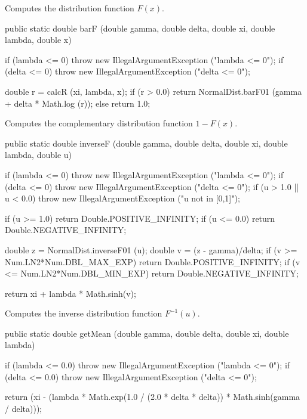  \begin{tabb}
  Computes the  distribution function $F(x)$.
 \end{tabb}
\begin{code}

   public static double barF (double gamma, double delta,
                              double xi, double lambda, double x)\begin{hide} {
      if (lambda <= 0)
         throw new IllegalArgumentException ("lambda <= 0");
      if (delta <= 0)
         throw new IllegalArgumentException ("delta <= 0");

      double r = calcR (xi, lambda, x);
      if (r > 0.0)
         return NormalDist.barF01 (gamma + delta * Math.log (r));
      else
         return 1.0;
   }\end{hide}
\end{code}
  \begin{tabb}
  Computes the complementary distribution function $1-F(x)$.
 \end{tabb}
\begin{code}

   public static double inverseF (double gamma, double delta,
                                  double xi, double lambda, double u)\begin{hide} {
      if (lambda <= 0)
         throw new IllegalArgumentException ("lambda <= 0");
      if (delta <= 0)
         throw new IllegalArgumentException ("delta <= 0");
      if (u > 1.0 || u < 0.0)
          throw new IllegalArgumentException ("u not in [0,1]");

      if (u >= 1.0)
         return Double.POSITIVE_INFINITY;
      if (u <= 0.0)
         return Double.NEGATIVE_INFINITY;

      double z = NormalDist.inverseF01 (u);
      double v = (z - gamma)/delta;
      if (v >= Num.LN2*Num.DBL_MAX_EXP)
         return Double.POSITIVE_INFINITY;
      if (v <= Num.LN2*Num.DBL_MIN_EXP)
         return Double.NEGATIVE_INFINITY;

      return xi + lambda * Math.sinh(v);
   }\end{hide}
\end{code}
  \begin{tabb}
  Computes the inverse distribution function $F^{-1}(u)$.
 \end{tabb}
\begin{code}

   public static double getMean (double gamma, double delta,
                                 double xi, double lambda)\begin{hide} {
      if (lambda <= 0.0)
         throw new IllegalArgumentException ("lambda <= 0");
      if (delta <= 0.0)
         throw new IllegalArgumentException ("delta <= 0");

      return (xi - (lambda * Math.exp(1.0 / (2.0 * delta * delta)) * 
                             Math.sinh(gamma / delta)));
   }\end{hide}
\end{code}
